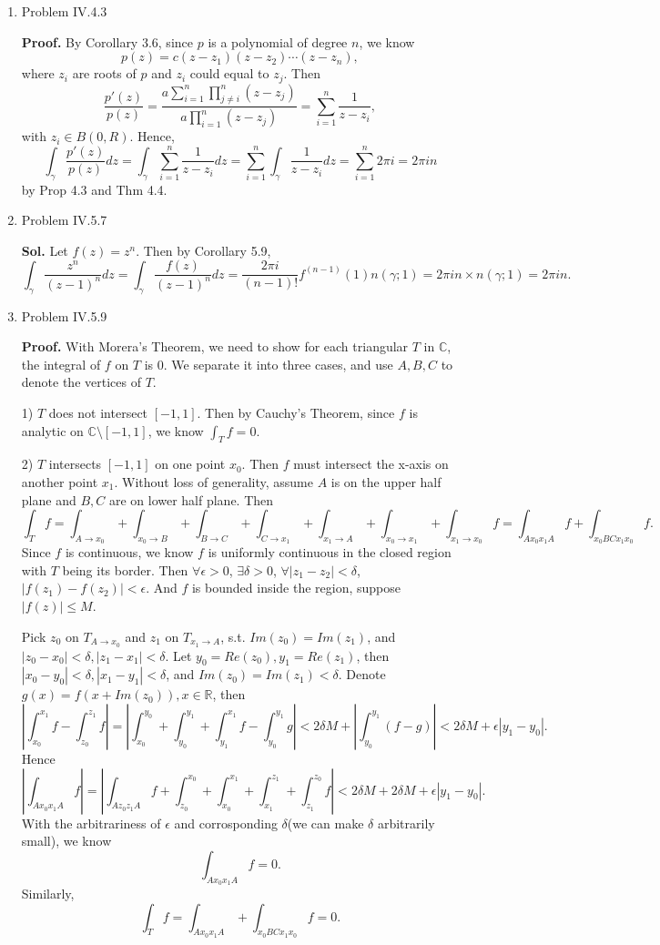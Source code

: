 \documentclass{article}%
\begin{document}
\begin{enumerate}
\item Problem IV.4.3

\textbf{Proof.} By Corollary 3.6, since $p$ is a polynomial of degree $n$, we know
$$
p(z) = c(z-z_1)(z-z_2)\cdots(z-z_n),
$$
where $z_i $ are roots of $p$ and $z_i $ could equal to $z_j $. Then
$$
\frac{p'(z)}{p(z)} = \frac{a\sum_{i=1}^{n}\prod_{j\ne i}^{n}(z-z_j)}{a\prod_{i=1}^{n}(z-z_j)} = \sum_{i=1}^{n}\frac{1}{z-z_i},
$$
with $z_i \in B(0, R) $.
Hence,
$$
\int_{\gamma}\frac{p'(z)}{p(z)}dz = \int_{\gamma}\sum_{i=1}^{n}\frac{1}{z-z_i}dz = \sum_{i=1}^{n}
\int_\gamma\frac{1}{z-z_i}dz = \sum_{i=1}^{n}2\pi i = 2\pi in
$$
by Prop 4.3 and Thm 4.4.

\item Problem IV.5.7

\textbf{Sol.}
Let $f(z) = z^n $. Then by Corollary 5.9,
$$
\int_{\gamma}\frac{z^n}{(z-1)^n}dz = \int_{\gamma}\frac{f(z)}{(z-1)^n}dz = \frac{2\pi i}{(n-1)!}f^{(n-1)}(1)n(\gamma; 1) = 2\pi in \times n(\gamma; 1) = 2\pi in.
$$

\item Problem IV.5.9

\textbf{Proof.} 
With Morera's Theorem, we need to show for each triangular $T$ in $\mathbb{C}$, the integral of $f$ on $T$ is 0. We separate it into three cases, and use $A, B, C$ to denote the vertices of $T$.

1) $T$ does not intersect $[-1, 1]$. Then by Cauchy's Theorem, since $f$ is analytic on $\mathbb{C}\setminus [-1, 1]$, we know $\int_{T}f = 0 $.

2) $T$ intersects $[-1, 1]$ on one point $x_0 $. Then $f$ must intersect the x-axis on another point $x_1 $. Without loss of generality, assume $A$ is on the upper half plane and $B, C$ are on lower half plane. Then
$$
\int_{T}f = \int_{A\to x_0}+\int_{x_0\to B}+\int_{B\to C}+\int_{C\to x_1}+\int_{x_1\to A}+\int_{x_0\to x_1}+\int_{x_1\to x_0}f = \int_{Ax_0x_1A}f + \int_{x_0BCx_1 x_0}f.
$$
Since $f$ is continuous, we know $f$ is uniformly continuous in the closed region with $T$ being its border. Then $\forall \epsilon > 0$, $\exists \delta > 0$, $\forall |z_1-z_2| < \delta $, $|f(z_1)-f(z_2)| < \epsilon$. And $f$ is bounded inside the region, suppose $|f(z)| \le M$.

Pick $z_0 $ on $T_{A\to x_0} $ and $z_1 $ on $T_{x_1\to A} $, s.t. $Im(z_0) = Im(z_1)$, and $|z_0-x_0| < \delta, |z_1-x_1| < \delta $. Let $y_0 = Re(z_0), y_1 = Re(z_1) $, then $|x_0-y_0| < \delta, |x_1-y_1| < \delta$, and $Im(z_0) = Im(z_1) < \delta$. Denote $g(x) = f(x + Im(z_0)), x\in\mathbb{R}$,
then
$$
\left|\int_{x_0}^{x_1} f - \int_{z_0}^{z_1}f\right| = \left|\int_{x_0}^{y_0}+\int_{y_0}^{y_1}+\int_{y_1}^{x_1}f - \int_{y_0}^{y_1}g\right| < 2\delta M + \left|\int_{y_0}^{y_1}(f-g)\right| < 2\delta M + \epsilon|y_1-y_0|.
$$
Hence
$$
\left|\int_{Ax_0x_1A}f\right| = \left|\int_{Az_0z_1A}f +\int_{z_0}^{x_0}+\int_{x_0}^{x_1}+\int_{x_1}^{z_1}+\int_{z_1}^{z_0}f\right| < 2\delta M + 2\delta M + \epsilon|y_1-y_0|.
$$
With the arbitrariness of $\epsilon$ and corrosponding $\delta$(we can make $\delta$ arbitrarily small), we know
$$
\int_{Ax_0x_1A}f = 0.
$$
Similarly, 
$$
\int_{T}f = \int_{Ax_0x_1A} + \int_{x_0BCx_1 x_0}f = 0.
$$


\end{enumerate}
\end{document}
